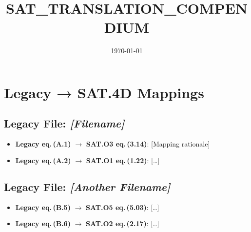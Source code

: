 \documentclass[12pt]{article}
\title{SAT\_TRANSLATION\_COMPENDIUM}
\date{\today}
\begin{document}
\maketitle

\section*{Legacy → SAT.4D Mappings}

\subsection*{Legacy File: \textit{[Filename]}}
\begin{itemize}
  \item \textbf{Legacy eq.\,(A.1)} $\to$ \textbf{SAT.O3 eq.\,(3.14)}: [Mapping rationale]
  \item \textbf{Legacy eq.\,(A.2)} $\to$ \textbf{SAT.O1 eq.\,(1.22)}: […]
\end{itemize}

\subsection*{Legacy File: \textit{[Another Filename]}}
\begin{itemize}
  \item \textbf{Legacy eq.\,(B.5)} $\to$ \textbf{SAT.O5 eq.\,(5.03)}: […]
  \item \textbf{Legacy eq.\,(B.6)} $\to$ \textbf{SAT.O2 eq.\,(2.17)}: […]
\end{itemize}

\end{document}

